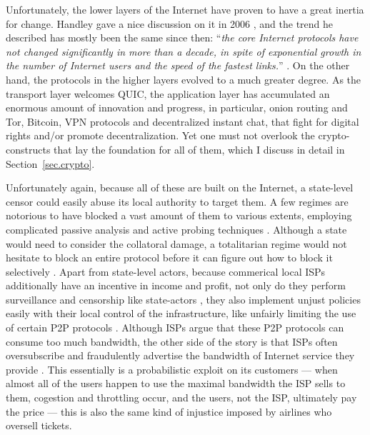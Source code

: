 \documentclass[10pt]{article}
\begin{document}
Unfortunately, the lower layers of the Internet have proven to have a great
inertia for change.  Handley gave a nice discussion on it in 2006
\cite{why.internet.just.works}, and the trend he described has mostly been the
same since then: ``\emph{the core Internet protocols have not changed
significantly in more than a decade, in spite of exponential growth in the
number of Internet users and the speed of the fastest links.}''
\cite{why.internet.just.works}. On the other hand, the protocols in the higher
layers evolved to a much greater degree. As the transport layer welcomes
QUIC\cite{quic}, the application layer has accumulated an enormous amount of
innovation and progress, in particular, onion routing and
Tor\cite{onion.routing, tor}, Bitcoin\cite{bitcoin}, VPN
protocols\cite{openvpn, wireguard} and decentralized instant chat\cite{matrix,
tox}, that fight for digital rights and/or promote decentralization. Yet one
must not overlook the crypto-constructs that lay the foundation for all of
them, which I discuss in detail in Section~\ref{sec.crypto}.

Unfortunately again, because all of these are built on the Internet, a
state-level censor could easily abuse its local authority to target them. A few
regimes are notorious to have blocked a vast amount of them to various
extents, employing complicated passive analysis and active probing techniques
\cite{censor.block.1, censor.block.2,censor.block.3, censor.block.4,
censor.block.5,censor.block.6}.
Although a state would need to consider the collatoral damage, a totalitarian
regime would not hesitate to block an entire protocol before it can figure out
how to block it selectively \cite{selective.block.1, censor.block.4}. 
Apart from state-level actors, because commerical local ISPs additionally
have an incentive in income and profit, not only do they perform surveillance
and censorship like state-actors \cite{isp.statelike.actions.1,
isp.statelike.actions.2}, they also implement unjust policies easily with their
local control of the infrastructure, like unfairly limiting the use of certain
P2P protocols \cite{isp.block.p2p.1, isp.block.p2p.2, isp.block.p2p.3,
isp.statelike.actions.1}.  Although ISPs argue that these P2P protocols can
consume too much bandwidth, the other side of the story is that ISPs often
oversubscribe and fraudulently advertise the bandwidth of Internet service they
provide \cite{isp.oversubscribe.1, isp.oversubscribe.2}. This essentially is a
probabilistic exploit on its customers --- when almost all of the users happen
to use the maximal bandwidth the ISP sells to them, cogestion and throttling
occur, and the users, not the ISP, ultimately pay the price --- this is also
the same kind of injustice imposed by airlines who oversell tickets.
\end{document}
